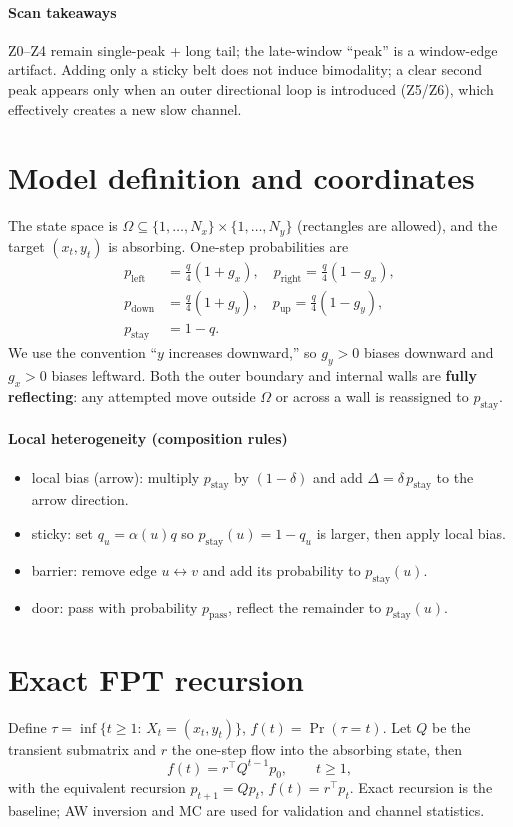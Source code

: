 \documentclass[11pt]{article}
\begin{document}
\paragraph{Scan takeaways}
Z0--Z4 remain single-peak + long tail; the late-window ``peak'' is a window-edge artifact. Adding only a sticky belt does not induce bimodality; a clear second peak appears only when an outer directional loop is introduced (Z5/Z6), which effectively creates a new slow channel.

\section{Model definition and coordinates}
The state space is $\Omega\subseteq\{1,\dots,N_x\}\times\{1,\dots,N_y\}$ (rectangles are allowed), and the target $(x_t,y_t)$ is absorbing. One-step probabilities are
\begin{align}
  p_{\text{left}} &= \frac{q}{4}(1+g_x),\quad p_{\text{right}} = \frac{q}{4}(1-g_x),\\
  p_{\text{down}} &= \frac{q}{4}(1+g_y),\quad p_{\text{up}} = \frac{q}{4}(1-g_y),\\
  p_{\text{stay}} &= 1-q.
\end{align}
We use the convention ``$y$ increases downward,'' so $g_y>0$ biases downward and $g_x>0$ biases leftward. Both the outer boundary and internal walls are \textbf{fully reflecting}: any attempted move outside $\Omega$ or across a wall is reassigned to $p_{\text{stay}}$.

\paragraph{Local heterogeneity (composition rules)}
\begin{itemize}
  \item local bias (arrow): multiply $p_{\text{stay}}$ by $(1-\delta)$ and add $\Delta=\delta\,p_{\text{stay}}$ to the arrow direction.
  \item sticky: set $q_u=\alpha(u)q$ so $p_{\text{stay}}(u)=1-q_u$ is larger, then apply local bias.
  \item barrier: remove edge $u\leftrightarrow v$ and add its probability to $p_{\text{stay}}(u)$.
  \item door: pass with probability $p_{\text{pass}}$, reflect the remainder to $p_{\text{stay}}(u)$.
\end{itemize}

\section{Exact FPT recursion}
Define $\tau=\inf\{t\ge1:\,X_t=(x_t,y_t)\}$, $f(t)=\Pr(\tau=t)$. Let $Q$ be the transient submatrix and $r$ the one-step flow into the absorbing state, then
\[
  f(t)=r^\top Q^{t-1}p_0,\qquad t\ge1,
\]
with the equivalent recursion $p_{t+1}=Qp_t$, $f(t)=r^\top p_t$. Exact recursion is the baseline; AW inversion and MC are used for validation and channel statistics.
\end{document}
